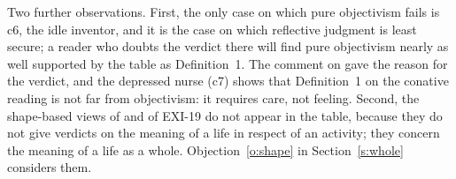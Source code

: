 Two further observations. First, the only case on which pure objectivism fails is c6, the idle inventor, and it is the case on which reflective judgment is least secure; a reader who doubts the verdict there will find pure objectivism nearly as well supported by the table as Definition~1. The comment on  gave the reason for the verdict, and the depressed nurse (c7) shows that Definition~1 on the conative reading is not far from objectivism: it requires care, not feeling. Second, the shape-based views of \citet{Kauppinen2012} and of EXI-19 do not appear in the table, because they do not give verdicts on the meaning of a life in respect of an activity; they concern the meaning of a life as a whole. Objection~\ref{o:shape} in Section~\ref{s:whole} considers them.
